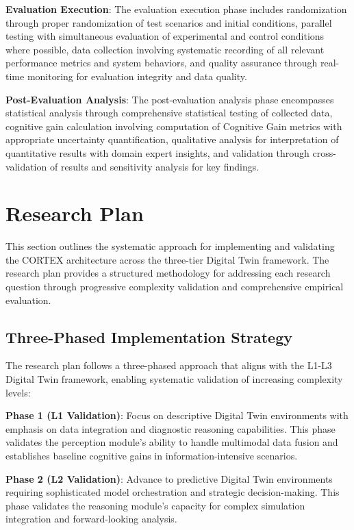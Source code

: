 \textbf{Evaluation Execution}: The evaluation execution phase includes randomization through proper randomization of test scenarios and initial conditions, parallel testing with simultaneous evaluation of experimental and control conditions where possible, data collection involving systematic recording of all relevant performance metrics and system behaviors, and quality assurance through real-time monitoring for evaluation integrity and data quality.

\textbf{Post-Evaluation Analysis}: The post-evaluation analysis phase encompasses statistical analysis through comprehensive statistical testing of collected data, cognitive gain calculation involving computation of Cognitive Gain metrics with appropriate uncertainty quantification, qualitative analysis for interpretation of quantitative results with domain expert insights, and validation through cross-validation of results and sensitivity analysis for key findings.

\section{Research Plan}

This section outlines the systematic approach for implementing and validating the CORTEX architecture across the three-tier Digital Twin framework. The research plan provides a structured methodology for addressing each research question through progressive complexity validation and comprehensive empirical evaluation.

\subsection{Three-Phased Implementation Strategy}

The research plan follows a three-phased approach that aligns with the L1-L3 Digital Twin framework, enabling systematic validation of increasing complexity levels:

\textbf{Phase 1 (L1 Validation)}: Focus on descriptive Digital Twin environments with emphasis on data integration and diagnostic reasoning capabilities. This phase validates the perception module's ability to handle multimodal data fusion and establishes baseline cognitive gains in information-intensive scenarios.

\textbf{Phase 2 (L2 Validation)}: Advance to predictive Digital Twin environments requiring sophisticated model orchestration and strategic decision-making. This phase validates the reasoning module's capacity for complex simulation integration and forward-looking analysis.

